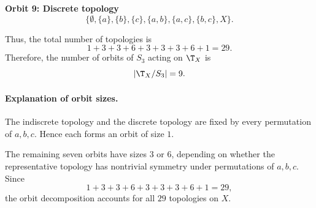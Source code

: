 \textbf{Orbit 9: Discrete topology}
\[ \{\emptyset,\{a\},\{b\},\{c\},\{a,b\},\{a,c\},\{b,c\},X\}. \]

Thus, the total number of topologies is
\[ 1+3+3+6+3+3+3+6+1=29. \]
Therefore, the number of orbits of $S_3$ acting on $\T_X$ is
\[ |\T_X/S_3|=9. \]

\paragraph{Explanation of orbit sizes.} The indiscrete topology and the discrete topology are
fixed by every permutation of $a,b,c$. Hence each forms an orbit of size $1$.

The remaining seven orbits have sizes $3$ or $6$, depending on whether the representative
topology has nontrivial symmetry under permutations of $a,b,c$. Since
\[ 1+3+3+6+3+3+3+6+1=29, \]
the orbit decomposition accounts for all $29$ topologies on $X$.
